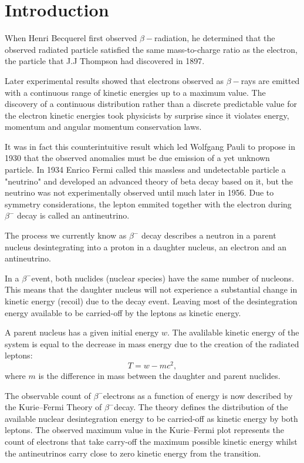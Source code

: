 \documentclass[12pt, a4paper]{article}
\begin{document}
\section{Introduction}
\begin{multicols}{2}
When Henri Becquerel first observed $\beta-$radiation, he determined that the observed radiated particle satisfied the same mass-to-charge ratio as the electron, the particle that J.J Thompson had discovered in 1897. 

Later experimental results showed that electrons observed as $\beta-$rays are emitted with a continuous range of kinetic energies up to a maximum value\cite{SMM}. 
The discovery of a continuous distribution rather than a discrete predictable value for the electron kinetic energies took physicists by surprise since it violates energy, momentum and angular momentum conservation laws.

It was in fact this counterintuitive result which led Wolfgang Pauli to propose in 1930 that the observed anomalies must be due emission of a yet unknown particle.
In 1934 Enrico Fermi called this massless and undetectable particle a "neutrino" and developed an advanced theory of beta decay based on it, but the neutrino was not experimentally observed until much later in 1956.\cite{Nave-beta} Due to symmetry considerations, the lepton emmited together with the electron during $\beta^{-}$ decay is called an antineutrino.

The process we currently know as $\beta^{-}$ decay describes a neutron in a parent nucleus desintegrating into a proton in a daughter nucleus, an electron and an antineutrino.

In a $\beta^{-}$event, both nuclides (nuclear species) have the same number of nucleons. This means that the daughter nucleus will not experience a substantial change in kinetic energy (recoil) due to the decay event. Leaving most of the desintegration energy available to be carried-off by the leptons as kinetic energy. 

A parent nucleus has a given initial energy $w$. 
The avalilable kinetic energy of the system is equal to the decrease in mass energy due to the creation of the radiated leptons:
\begin{equation}T = w - m c^2,
\end{equation} where $m$ is the difference in mass between the daughter and parent nuclides.

The observable count of $\beta^{-}$electrons as a function of energy is now described by the Kurie--Fermi Theory of $\beta^{-}$decay. The theory defines the distribution of the available nuclear desintegration energy to be carried-off as kinetic energy by both leptons. The observed maximum value in the Kurie--Fermi plot represents the count of electrons that take carry-off the maximum possible kinetic energy whilst the antineutrinos carry close to zero kinetic energy from the transition.


\end{multicols}
\end{document}
